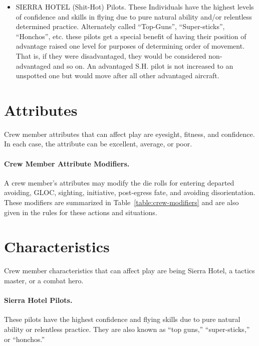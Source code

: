 \begin{advancedrules}
{\begin{itemize}
    \item SIERRA HOTEL (Shit-Hot) Pilots. These Individuals have the highest levels of confidence and skills in flying due to pure natural ability and/or relentless determined practice. Alternately called “Top-Guns”, “Super-sticks”, “Honchos”, etc. these pilots get a special benefit of having their position of advantage raised one level for purposes of determining order of movement. That is, if they were disadvantaged, they would be considered non-advantaged and so on. An advantaged S.H. pilot is not increased to an unspotted one but would move after all other advantaged aircraft. 

\end{itemize}
}{
\section{Attributes}
\label{rule:crew-attributes}

Crew member attributes that can affect play are eyesight, fitness, and confidence. In each case, the attribute can be excellent, average, or poor.

\paragraph{Crew Member Attribute Modifiers.} A crew member's attributes may modify the die rolls for entering departed avoiding, GLOC, sighting, initiative, post-egress fate, and avoiding disorientation. These modifiers are summarized in Table~\ref{table:crew-modifiers} and are also given in the rules for these actions and situations.

\section{Characteristics}
\label{rule:crew-characteristics}

Crew member characteristics that can affect play are being Sierra Hotel, a tactics master, or a combat hero.

\paragraph{Sierra Hotel Pilots.} These pilots have the highest confidence and flying skills due to pure natural ability or relentless practice. They are also known as “top guns,” “super-sticks,” or “honchos.” 

}
\end{advancedrules}
